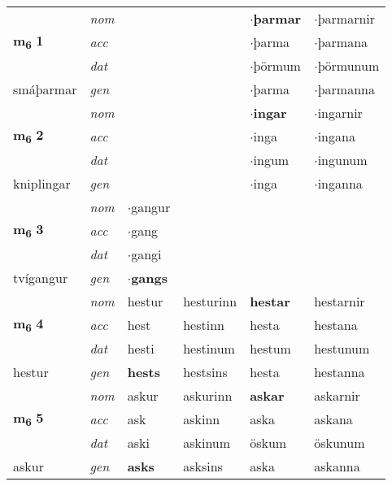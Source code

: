 \begin{longtable}[l]{llllll}
\multirow{3}{*}{{{\textbf{m{\textsubscript{6}}} \Large{\textbf{1}}}}}  & {\footnotesize{{\textit{nom}}}} &  &     & \textbf{$\cdot$þarmar} & $\cdot$þarmarnir  \\*
 &  {\footnotesize{{\textit{acc}}}} &   &    & $\cdot$þarma  & $\cdot$þarmana \\*
 &  {\footnotesize{{\textit{dat}}}} &  &    & $\cdot$þörmum & $\cdot$þörmunum \\*
 {\footnotesize{smáþarmar}} &   {\footnotesize{{\textit{gen}}}} & \textbf{}  &   & $\cdot$þarma & $\cdot$þarmanna \\
\cmidrule{1-6}


\multirow{3}{*}{{{\textbf{m{\textsubscript{6}}} \Large{\textbf{2}}}}}  & {\footnotesize{{\textit{nom}}}} &  &     & \textbf{$\cdot$ingar} & $\cdot$ingarnir  \\*
 &  {\footnotesize{{\textit{acc}}}} &   &    & $\cdot$inga  & $\cdot$ingana \\*
 &  {\footnotesize{{\textit{dat}}}} &  &    & $\cdot$ingum & $\cdot$ingunum \\*
 {\footnotesize{kniplingar}} &   {\footnotesize{{\textit{gen}}}} & \textbf{}  &   & $\cdot$inga & $\cdot$inganna \\
\cmidrule{1-6}


\multirow{3}{*}{{{\textbf{m{\textsubscript{6}}} \Large{\textbf{3}}}}}  & {\footnotesize{{\textit{nom}}}} & $\cdot$gangur &     & \textbf{} &   \\*
 &  {\footnotesize{{\textit{acc}}}} & $\cdot$gang  &    &   &  \\*
 &  {\footnotesize{{\textit{dat}}}} & $\cdot$gangi &    &  &  \\*
 {\footnotesize{tvígangur}} &   {\footnotesize{{\textit{gen}}}} & \textbf{$\cdot$gangs}  &   &  &  \\
\cmidrule{1-6}


\multirow{3}{*}{{{\textbf{m{\textsubscript{6}}} \Large{\textbf{4}}}}}  & {\footnotesize{{\textit{nom}}}} & hestur & hesturinn    & \textbf{hestar} & hestarnir  \\*
 &  {\footnotesize{{\textit{acc}}}} & hest  & hestinn   & hesta  & hestana \\*
 &  {\footnotesize{{\textit{dat}}}} & hesti & hestinum   & hestum & hestunum \\*
 {\footnotesize{hestur}} &   {\footnotesize{{\textit{gen}}}} & \textbf{hests}  & hestsins  & hesta & hestanna \\
\cmidrule{1-6}


\multirow{3}{*}{{{\textbf{m{\textsubscript{6}}} \Large{\textbf{5}}}}}  & {\footnotesize{{\textit{nom}}}} & askur & askurinn    & \textbf{askar} & askarnir  \\*
 &  {\footnotesize{{\textit{acc}}}} & ask  & askinn   & aska  & askana \\*
 &  {\footnotesize{{\textit{dat}}}} & aski & askinum   & öskum & öskunum \\*
 {\footnotesize{askur}} &   {\footnotesize{{\textit{gen}}}} & \textbf{asks}  & asksins  & aska & askanna \\
\cmidrule{1-6}



\end{longtable}
